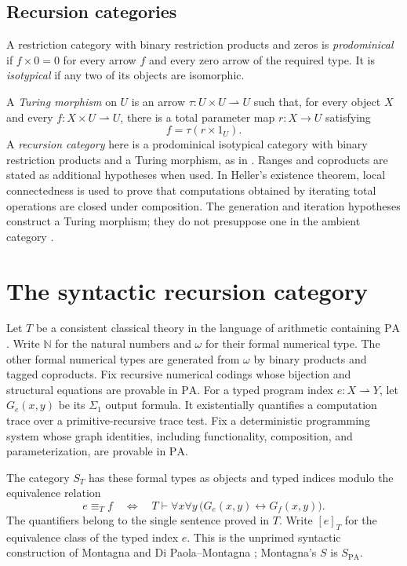 \documentclass[11pt]{article}
\newcommand{\N}{\mathbb N}
\newcommand{\PA}{\mathrm{PA}}
\begin{document}
\subsection{Recursion categories}

A restriction category with binary restriction products and zeros is
\emph{prodominical} if $f\times0=0$ for every arrow $f$ and every
zero arrow of the required type. It is \emph{isotypical} if any
two of its objects are isomorphic.

A \emph{Turing morphism} on $U$ is an arrow
$\tau:U\times U\rightharpoonup U$ such that, for every object $X$
and every $f:X\times U\rightharpoonup U$, there is a total
parameter map $r:X\to U$ satisfying
\[
 f=\tau(r\times1_U).
\]
A \emph{recursion category} here is a prodominical isotypical
category with binary restriction products and a Turing morphism,
as in \cite[Section 9]{Heller}.
Ranges and coproducts are stated as additional hypotheses when used.
In Heller's existence theorem, local connectedness is used to prove
that computations obtained by iterating total operations are closed
under composition. The generation and iteration hypotheses construct
a Turing morphism; they do not presuppose one in the ambient category
\cite[Sections 8--9]{Heller}.

\section{The syntactic recursion category}\label{sec:syntactic}

Let $T$ be a consistent classical theory in the language of arithmetic
containing $\PA$. Write $\N$ for the natural numbers and $\omega$
for their formal numerical type. The other formal numerical types are
generated from $\omega$ by binary products and tagged coproducts.
Fix recursive numerical codings
whose bijection and structural equations are provable in $\PA$.
For a typed program index $e:X\rightharpoonup Y$, let $G_e(x,y)$ be its
$\Sigma_1$ output formula. It existentially quantifies a computation trace
over a primitive-recursive trace test. Fix a deterministic programming
system whose graph identities, including functionality, composition,
and parameterization, are provable in $\PA$.

The category $S_T$ has these formal types as objects and typed indices
modulo the equivalence relation
\begin{equation}\label{eq:uniform}
 e\equiv_T f
 \quad\Longleftrightarrow\quad
 T\vdash \forall x\forall y\,
       \bigl(G_e(x,y)\leftrightarrow G_f(x,y)\bigr).
\end{equation}
The quantifiers belong to the single sentence proved in $T$.
Write $[e]_T$ for the equivalence class of the typed index $e$.
This is the unprimed syntactic construction of Montagna and
Di Paola--Montagna \cite{Montagna,DPM}; Montagna's $S$ is $S_{\PA}$.
\end{document}
